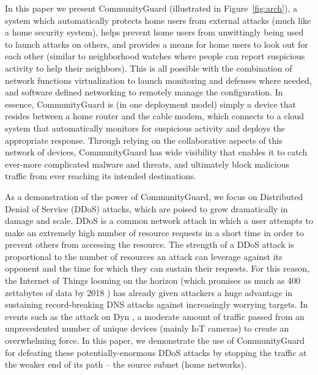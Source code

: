 In this paper we present CommunityGuard (illustrated in Figure~\ref{fig:arch}), a system which automatically protects home users from external attacks (much like a home security system), helps prevent home users from unwittingly being used to launch attacks on others, and provides a means for home users to look out for each other (similar to neighborhood watches where people can report suspicious activity to help their neighbors).  This is all possible with the combination of network functions virtualization to launch monitoring and defenses where needed, and software defined networking to remotely manage the configuration.  In essence, CommunityGuard is (in one deployment model) simply a device that resides between a home router and the cable modem, which connects to a cloud system that automatically monitors for suspicious activity and deploys the appropriate response.  Through relying on the collaborative aspects of this network of devices, CommunityGuard has wide visibility that enables it to catch ever-more complicated malware and threats, and ultimately block malicious traffic from ever reaching its intended destinations. 

As a demonstration of the power of CommunityGuard, we focus on Distributed Denial of Service (DDoS) attacks, which are poised to grow dramatically in damage and scale.  DDoS is a common network attack in which a user attempts to make an extremely high number of resource requests in a short time in order to prevent others from accessing the resource. The strength of a DDoS attack is proportional to the number of resources an attack can leverage against its opponent and the time for which they can sustain their requests. For this reason, the Internet of Things looming on the horizon (which promises as much as 400 zettabytes of data by 2018 \cite{zetta}) has already given attackers a huge advantage in sustaining record-breaking DNS attacks against increasingly worrying targets. In events such as the attack on Dyn \cite{dyn}, a moderate amount of traffic passed from an unprecedented number of unique devices (mainly IoT cameras) to create an overwhelming force.  In this paper, we demonstrate the use of CommunityGuard for defeating these potentially-enormous DDoS attacks by stopping the traffic at the weaker end of its path -- the source subnet (home networks). 




